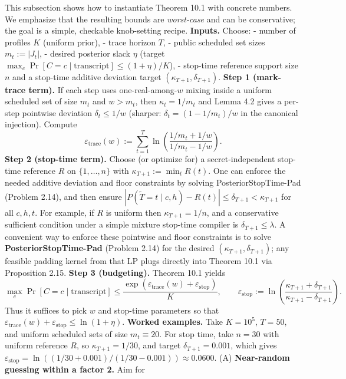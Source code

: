 \documentclass[11pt]{article}
\begin{document}
This subsection shows how to instantiate Theorem 10.1 with concrete
numbers. We emphasize that the resulting bounds are \emph{worst-case}
and can be conservative; the goal is a simple, checkable knob-setting
recipe. \textbf{Inputs.} Choose: - number of profiles \(K\) (uniform
prior), - trace horizon \(T\), - public scheduled set sizes
\(m_t:=|J_t|\), - desired posterior slack \(\eta\) (target
\(\max_c \Pr[C=c\mid \text{transcript}]\le (1+\eta)/K\)), - stop-time
reference support size \(n\) and a stop-time additive deviation target
\((\kappa_{T+1},\delta_{T+1})\). \textbf{Step 1 (mark-trace term).} If
each step uses one-real-among-\(w\) mixing inside a uniform scheduled
set of size \(m_t\) and \(w>m_t\), then \(\kappa_t=1/m_t\) and Lemma 4.2
gives a per-step pointwise deviation \(\delta_t\le 1/w\) (sharper:
\(\delta_t=(1-1/m_t)/w\) in the canonical injection). Compute \[
\varepsilon_{\mathrm{trace}}(w):=\sum_{t=1}^T \ln\!\left(\frac{1/m_t+1/w}{1/m_t-1/w}\right).
\] \textbf{Step 2 (stop-time term).} Choose (or optimize for) a
secret-independent stop-time reference \(R\) on \(\{1,\dots,n\}\) with
\(\kappa_{T+1}:=\min_t R(t)\). One can enforce the needed additive
deviation and floor constraints by solving PosteriorStopTime-Pad
(Problem 2.14), and then ensure
\(|P(\widetilde T=t\mid c,h)-R(t)|\le \delta_{T+1}<\kappa_{T+1}\) for
all \(c,h,t\). For example, if \(R\) is uniform then
\(\kappa_{T+1}=1/n\), and a conservative sufficient condition under a
simple mixture stop-time compiler is \(\delta_{T+1}\le \lambda\). A
convenient way to enforce these pointwise and floor constraints is to
solve \textbf{PosteriorStopTime-Pad} (Problem 2.14) for the desired
\((\kappa_{T+1},\delta_{T+1})\); any feasible padding kernel from that
LP plugs directly into Theorem 10.1 via Proposition 2.15. \textbf{Step 3
(budgeting).} Theorem 10.1 yields \[
\max_c \Pr[C=c\mid \text{transcript}] \le \frac{\exp(\varepsilon_{\mathrm{trace}}(w)+\varepsilon_{\mathrm{stop}})}{K},
\qquad
\varepsilon_{\mathrm{stop}}:=\ln\!\left(\frac{\kappa_{T+1}+\delta_{T+1}}{\kappa_{T+1}-\delta_{T+1}}\right).
\] Thus it suffices to pick \(w\) and stop-time parameters so that
\(\varepsilon_{\mathrm{trace}}(w)+\varepsilon_{\mathrm{stop}}\le \ln(1+\eta)\).
\textbf{Worked examples.} Take \(K=10^5\), \(T=50\), and uniform
scheduled sets of size \(m_t\equiv 20\). For stop time, take \(n=30\)
with uniform reference \(R\), so \(\kappa_{T+1}=1/30\), and target
\(\delta_{T+1}=0.001\), which gives
\(\varepsilon_{\mathrm{stop}}=\ln((1/30+0.001)/(1/30-0.001))\approx 0.0600\).
(A) \textbf{Near-random guessing within a factor 2.} Aim for
\end{document}
